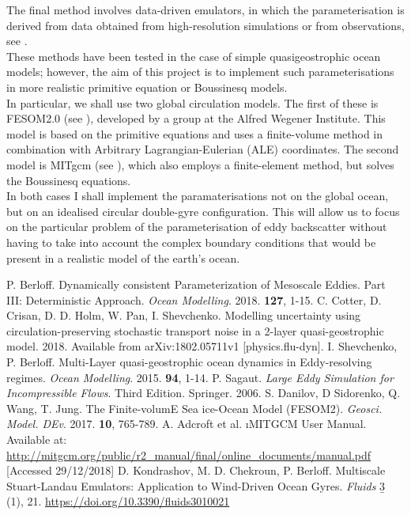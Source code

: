 \documentclass[11pt]{article}
\begin{document}
		\indnt The final method involves data-driven emulators, in which the parameterisation is derived from data obtained from high-resolution simulations or from observations, see \cite{vii}. \\
		\linebreak
		These methods have been tested in the case of simple quasigeostrophic ocean models; however, the aim of this project is to implement such parameterisations in more realistic primitive equation or Boussinesq models. \\
		 \indnt In particular, we shall use two global circulation models. The first of these is FESOM2.0 (see \cite{v}), developed by a group at the Alfred Wegener Institute. This model is based on the primitive equations and uses a finite-volume method in combination with Arbitrary Lagrangian-Eulerian (ALE) coordinates. The second model is MITgcm (see \cite{vi}), which also employs a finite-element method, but solves the Boussinesq equations.\\
		 \indnt In both cases I shall implement the paramaterisations not on the global ocean, but on an idealised circular double-gyre configuration. This will allow us to focus on the particular problem of the parameterisation of eddy backscatter without having to take into account the complex boundary conditions that would be present in a realistic model of the earth's ocean.

\begin{thebibliography}{9}
	  P. Berloff. Dynamically consistent Parameterization of Mesoscale Eddies. Part III: Deterministic Approach. \textit{Ocean Modelling}. 2018. \textbf{127}, 1-15.
	 C. Cotter, D. Crisan, D. D. Holm, W. Pan, I. Shevchenko. Modelling uncertainty using circulation-preserving stochastic transport noise in a 2-layer quasi-geostrophic model. 2018. Available from arXiv:1802.05711v1 [physics.flu-dyn].
	 I. Shevchenko, P. Berloff. Multi-Layer quasi-geostrophic ocean dynamics in Eddy-resolving regimes. \textit{Ocean Modelling}. 2015. \textbf{94}, 1-14.
	 P. Sagaut. \textit{Large Eddy Simulation for Incompressible Flows}. Third Edition. Springer. 2006. 
	 S. Danilov, D Sidorenko, Q. Wang, T. Jung. The Finite-volumE Sea ice-Ocean Model (FESOM2). \textit{Geosci. Model. DEv}. 2017. \textbf{10}, 765-789.
	 A. Adcroft et al. \i{MITGCM User Manual}. Available at: \url{http://mitgcm.org/public/r2_manual/final/online_documents/manual.pdf} [Accessed 29/12/2018]
	 D. Kondrashov, M. D. Chekroun, P. Berloff. Multiscale Stuart-Landau Emulators: Application to Wind-Driven Ocean Gyres. \textit{Fluids} \b{3} (1), 21. \url{https://doi.org/10.3390/fluids3010021}
\end{thebibliography}


	
\end{document}
